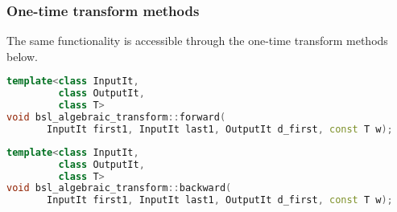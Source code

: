 \subsubsection*{One-time transform methods}
The same functionality is accessible through the one-time transform methods
below.

\begin{lstlisting}[language=C++,caption=Forward algebraic transform.]
template<class InputIt,
         class OutputIt,
         class T>
void bsl_algebraic_transform::forward(
       InputIt first1, InputIt last1, OutputIt d_first, const T w);
\end{lstlisting}
\begin{lstlisting}[language=C++,caption=Backward algebraic transform.]
template<class InputIt,
         class OutputIt,
         class T>
void bsl_algebraic_transform::backward(
       InputIt first1, InputIt last1, OutputIt d_first, const T w);
\end{lstlisting}


